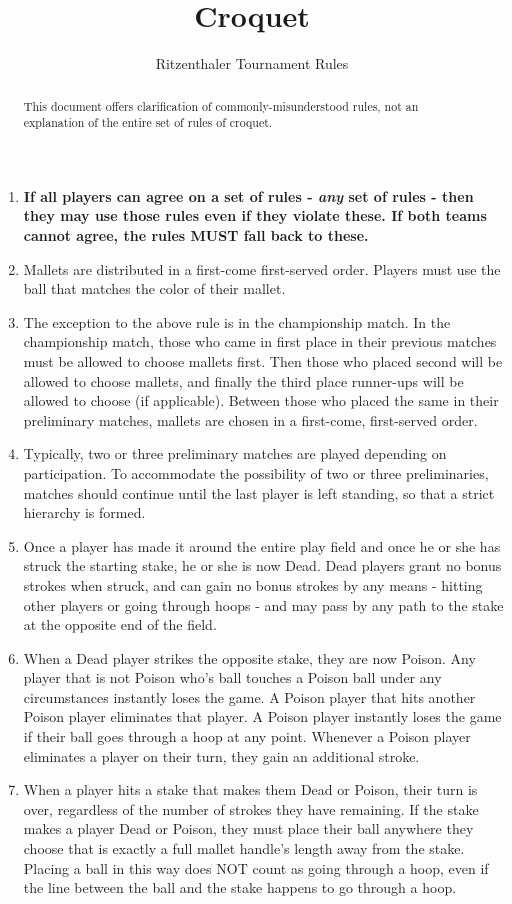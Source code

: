 \documentclass[a4paper]{article}
\title{Croquet}
\author{Ritzenthaler Tournament Rules}
\begin{document}
\maketitle
\begin{abstract}
This document offers clarification of commonly-misunderstood rules, not an explanation of the entire set of rules of croquet.
\end{abstract}

\begin{enumerate}
\item \textbf{If all players can agree on a set of rules - \textit{any} set of rules - then they may use those rules even if they violate these. If both teams cannot agree, the rules MUST fall back to these.}
\item Mallets are distributed in a first-come first-served order. Players must use the ball that matches the color of their mallet.
\item The exception to the above rule is in the championship match. In the championship match, those who came in first place in their previous matches must be allowed to choose mallets first. Then those who placed second will be allowed to choose mallets, and finally the third place runner-ups will be allowed to choose (if applicable). Between those who placed the same in their preliminary matches, mallets are chosen in a first-come, first-served order.
\item Typically, two or three preliminary matches are played depending on participation. To accommodate the possibility of two or three preliminaries, matches should continue until the last player is left standing, so that a strict hierarchy is formed.
\item Once a player has made it around the entire play field and once he or she has struck the starting stake, he or she is now Dead. Dead players grant no bonus strokes when struck, and can gain no bonus strokes by any means - hitting other players or going through hoops - and may pass by any path to the stake at the opposite end of the field.
\item When a Dead player strikes the opposite stake, they are now Poison. Any player that is not Poison who's ball touches a Poison ball under any circumstances instantly loses the game. A Poison player that hits another Poison player eliminates that player. A Poison player instantly loses the game if their ball goes through a hoop at any point. Whenever a Poison player eliminates a player on their turn, they gain an additional stroke.
\item When a player hits a stake that makes them Dead or Poison, their turn is over, regardless of the number of strokes they have remaining. If the stake makes a player Dead or Poison, they must place their ball anywhere they choose that is exactly a full mallet handle's length away from the stake. Placing a ball in this way does NOT count as going through a hoop, even if the line between the ball and the stake happens to go through a hoop.

\end{enumerate}
\end{document}
